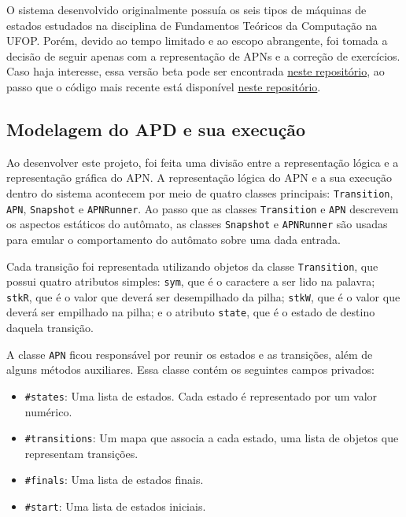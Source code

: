 O sistema desenvolvido originalmente possuía os seis tipos de máquinas de estados estudados na disciplina de Fundamentos Teóricos da Computação na UFOP. Porém, devido ao tempo limitado e ao escopo abrangente, foi tomada a decisão de seguir apenas com a representação de APNs e a correção de exercícios. Caso haja interesse, essa versão beta pode ser encontrada \href{https://matheushvribeiro.github.io/simulador-de-automatos/index.html}{neste repositório}, ao passo que o código mais recente está disponível \href{https://github.com/lives-group/APN-simulator}{neste repositório}.

\subsection{Modelagem do APD e sua execução}
\label{sec:rpl}

Ao desenvolver este projeto, foi feita uma divisão entre a representação lógica e a representação gráfica do APN. A representação lógica do APN e a sua execução dentro do sistema acontecem por meio de quatro classes principais: \texttt{Transition}, \texttt{APN}, \texttt{Snapshot} e \texttt{APNRunner}. Ao passo que as classes \texttt{Transition} e \texttt{APN} descrevem os aspectos estáticos do autômato, as classes \texttt{Snapshot} e \texttt{APNRunner} são usadas para emular o comportamento do autômato sobre uma dada entrada.

Cada transição foi representada utilizando objetos da classe \texttt{Transition}, que possui quatro atributos simples: \texttt{sym}, que é o caractere a ser lido na palavra; \texttt{stkR}, que é o valor que deverá ser desempilhado da pilha; \texttt{stkW}, que é o valor que deverá ser empilhado na pilha; e o atributo \texttt{state}, que é o estado de destino daquela transição.

A classe \texttt{APN} ficou responsável por reunir os estados e as transições, além de alguns métodos auxiliares. Essa classe contém os seguintes campos privados:
\begin{itemize}
   \item \texttt{\#states}: Uma lista de estados. Cada estado é representado por um valor numérico.
   \item \texttt{\#transitions}: Um mapa que associa a cada estado, uma lista de objetos que representam transições.
   \item \texttt{\#finals}: Uma lista de estados finais.
   \item \texttt{\#start}: Uma lista de estados iniciais.
\end{itemize}

